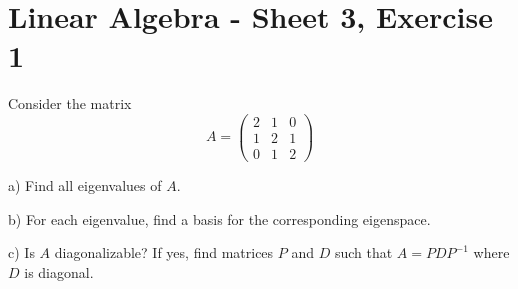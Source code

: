 \documentclass{article}
\begin{document}
\section*{Linear Algebra - Sheet 3, Exercise 1}

Consider the matrix
$$A = \begin{pmatrix}
2 & 1 & 0 \\
1 & 2 & 1 \\
0 & 1 & 2
\end{pmatrix}$$

a) Find all eigenvalues of $A$.

b) For each eigenvalue, find a basis for the corresponding eigenspace.

c) Is $A$ diagonalizable? If yes, find matrices $P$ and $D$ such that $A = PDP^{-1}$ where $D$ is diagonal.
\end{document}
